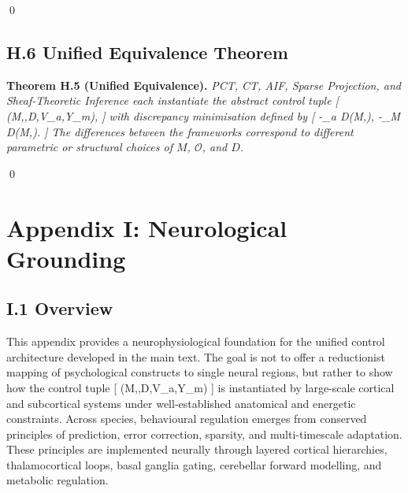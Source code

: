 \documentclass[11pt,a4paper,twoside]{article}
\begin{document}
\qed

\begin{center}
\end{center}

\subsection*{H.6 Unified Equivalence Theorem}

\medskip

\noindent\textbf{Theorem H.5 (Unified Equivalence).}
\emph{
PCT, CT, AIF, Sparse Projection, and Sheaf-Theoretic Inference each instantiate the abstract control tuple
[
(M,,D,V_a,Y_m),
]
with discrepancy minimisation defined by
[
 \in -\nabla_a D(M,), \qquad
{} \in -\nabla_M D(M,).
]
The differences between the frameworks correspond to different parametric or structural choices of $M$, $\mathcal{O}$, and $D$.
}

\qed

\section*{Appendix I: Neurological Grounding}

\subsection*{I.1 Overview}

This appendix provides a neurophysiological foundation for the unified control architecture developed in the main text. The goal is not to offer a reductionist mapping of psychological constructs to single neural regions, but rather to show how the control tuple
[
(M,,D,V_a,Y_m)
]
is instantiated by large-scale cortical and subcortical systems under well-established anatomical and energetic constraints. Across species, behavioural regulation emerges from conserved principles of prediction, error correction, sparsity, and multi-timescale adaptation. These principles are implemented neurally through layered cortical hierarchies, thalamocortical loops, basal ganglia gating, cerebellar forward modelling, and metabolic regulation.
\end{document}
